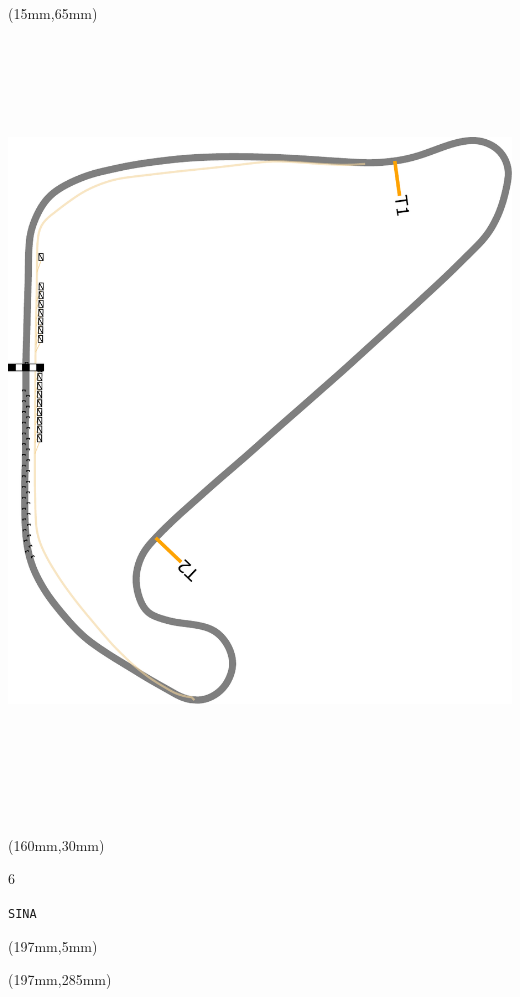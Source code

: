 \begin{textblock*}{185mm}(15mm,65mm)%
\centering
\mbox{\includegraphics[width=185mm,height=210mm,keepaspectratio]{PT/SINA.pdf}}
\end{textblock*}
\begin{textblock*}{40mm}(160mm,30mm)%
\Large
\par{} 
\par6 
\par\hfill\tiny\tt SINA\\
\end{textblock*}
\begin{textblock*}{20mm}(197mm,5mm)%
\fbox{\thepage}
\label{SINA}
\end{textblock*}
\begin{textblock*}{20mm}(197mm,285mm)%
\fbox{\thepage}
\end{textblock*}

